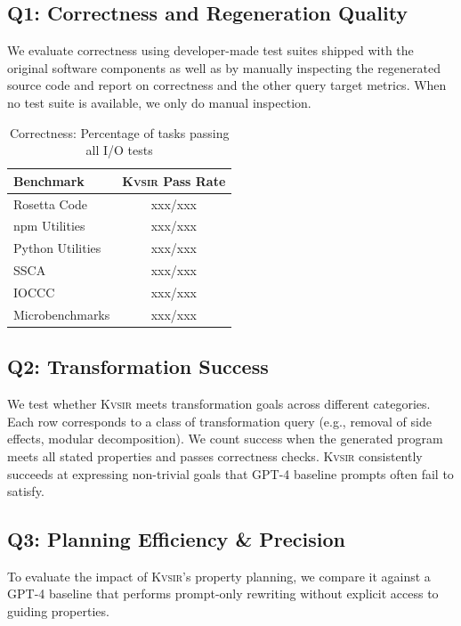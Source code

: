 \documentclass[noacm,sigplan]{acmart}
\newcommand{\sys}{{\scshape Kv{\textalpha}sir}\xspace}
\newcommand{\xxx}{\colorbox{red!30}{xxx}\xspace}
\begin{document}
\subsection{Q1: Correctness and Regeneration Quality}

We evaluate correctness using developer-made test suites 
shipped with the original software components as well as by manually inspecting
the regenerated source code and report on correctness and the other query target metrics.
When no test suite is available, we only do manual inspection.

\begin{table}[h]
  \centering
  \caption{Correctness: Percentage of tasks passing all I/O tests}
  \begin{tabular}{lc}
    \toprule
    Benchmark & \sys Pass Rate \\ 
    \midrule
    Rosetta Code & \xxx/\xxx  \\
    npm Utilities & \xxx/\xxx \\
    Python Utilities & \xxx/\xxx \\
    SSCA & \xxx/\xxx  \\
    IOCCC & \xxx/\xxx  \\
    Microbenchmarks & \xxx/\xxx  \\
    \bottomrule
  \end{tabular}
\end{table}

\subsection{Q2: Transformation Success}

We test whether \sys meets transformation goals across different categories.
Each row corresponds to a class of transformation query (e.g., removal of side effects, modular decomposition).
We count success when the generated program meets all stated properties and passes correctness checks.
\sys consistently succeeds at expressing non-trivial goals that GPT-4 baseline prompts often fail to satisfy.

\subsection{Q3: Planning Efficiency \& Precision}

To evaluate the impact of \sys's property planning, we compare it against a GPT-4 baseline that performs prompt-only rewriting without explicit access to guiding properties.
\end{document}
